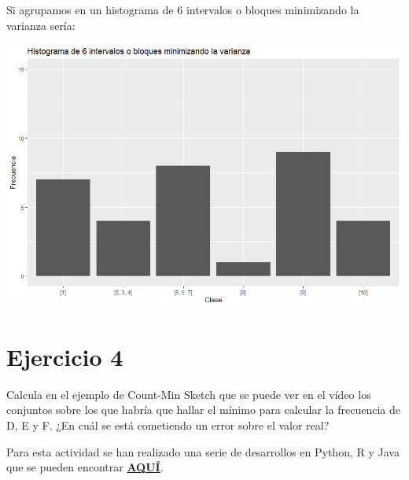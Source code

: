 \documentclass{uimppracticas}
\begin{document}
Si agrupamos en un histograma de 6 intervalos o bloques minimizando la varianza sería:

\begin{center}
	\includegraphics[scale=0.7]{code/exercise_three/hist_3}
\end{center}

\section{Ejercicio 4}

Calcula en el ejemplo de Count-Min Sketch que se puede ver en el vídeo los conjuntos sobre los que habría que hallar el mínimo para calcular la frecuencia de D, E y F. ¿En cuál se está cometiendo un error sobre el valor real?

\lstlistoflistings

Para esta actividad se han realizado una serie de desarrollos en Python, R y Java que se pueden encontrar \href{https://github.com/lrodrin/masterAI/tree/master/A9/Data\%20Streams/methodologies}{\textbf{AQUÍ}}.
\end{document}
